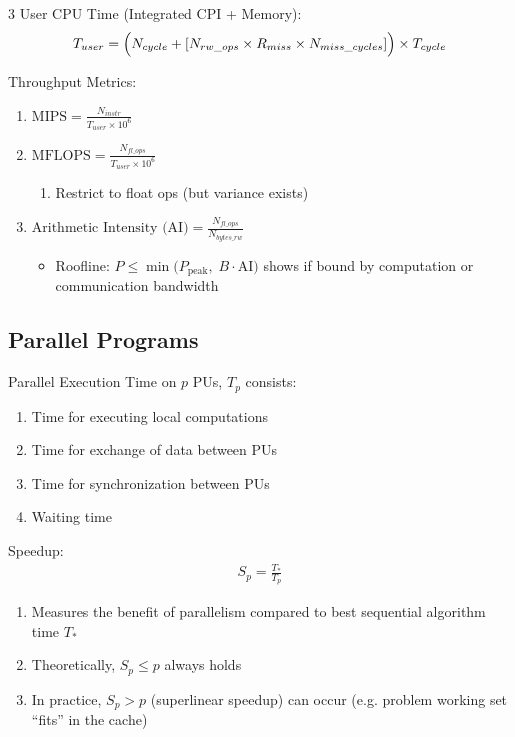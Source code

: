 \documentclass[12pt, a4paper]{article}
\begin{document}
\begin{multicols*}{3}
User CPU Time (Integrated CPI + Memory):
\begin{gather*}
  T_{user} =
  \Bigl(N_{cycle} + [N_{rw\_ops}\times R_{miss}\times N_{miss\_cycles}]\Bigr)
  \times T_{cycle}
\end{gather*}

Throughput Metrics:
\begin{enumerate}[\roman*.]
  \item $\text{MIPS} = \frac{N_{instr}}{T_{user} \times 10^6}$ 
  \item $\text{MFLOPS} = \frac{N_{fl\_ops}}{T_{user} \times 10^6}$
  \begin{enumerate}[leftmargin=*, label=$+$]\vspace{5pt}
    \item Restrict to float ops (but variance exists)
  \end{enumerate}
  \item $\text{Arithmetic Intensity (AI)} = \frac{N_{fl\_ops}}{N_{bytes\_rw}}$
  \begin{itemize}[leftmargin=*, label=$+$]\vspace{3pt}
    \item Roofline: $P \le \min\!\big(P_{\text{peak}},\; B\cdot \text{AI}\big)$ shows if bound by computation or communication bandwidth
  \end{itemize}
\end{enumerate}

\colbreak
\subsection{Parallel Programs}
Parallel Execution Time on $p$ PUs, $T_p$ consists:
\begin{enumerate}[\roman*.]
  \item Time for executing local computations
  \item Time for exchange of data between PUs
  \item Time for synchronization between PUs
  \item Waiting time
\end{enumerate}\vspace{1em}

Speedup:
\begin{gather*}
  S_p = \frac{T_{*}}{T_p}
\end{gather*}
\begin{enumerate}[\roman*.]
  \item Measures the benefit of parallelism compared to best sequential algorithm time $T_*$ 
  \item Theoretically, $S_p \le p$ always holds
  \item In practice, $S_p > p$ (superlinear speedup) can occur (e.g. problem working set ``fits'' in the cache)
\end{enumerate}\vspace{1em}


\end{multicols*}
\end{document}
